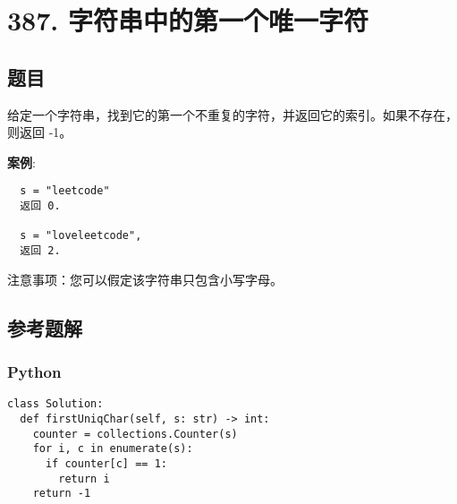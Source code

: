 \newpage
\section{387. 字符串中的第一个唯一字符}
\label{leetcode:387}

\subsection{题目}

给定一个字符串，找到它的第一个不重复的字符，并返回它的索引。如果不存在，则返回 -1。

\textbf{案例}:

\begin{verbatim}
  s = "leetcode"
  返回 0.

  s = "loveleetcode",
  返回 2.
\end{verbatim}

注意事项：您可以假定该字符串只包含小写字母。

\subsection{参考题解}

\subsubsection{Python}

\begin{verbatim}
class Solution:
  def firstUniqChar(self, s: str) -> int:
    counter = collections.Counter(s)
    for i, c in enumerate(s):
      if counter[c] == 1:
        return i
    return -1
\end{verbatim}
